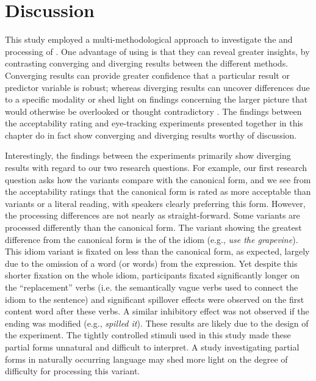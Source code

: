 \documentclass[output=paper
,modfonts
,nonflat]{langsci/langscibook}
\begin{document}

\section{Discussion} 

This study employed a multi-methodological  approach to investigate the  and processing  of . One advantage of using  is that they can reveal greater insights, by contrasting converging and diverging results between the different methods. Converging results can provide greater confidence that a particular result or predictor variable is robust; whereas diverging results can uncover differences due to a specific modality or shed light on findings concerning the larger picture that would otherwise be overlooked or thought contradictory \citep{ArppeJarvikivi2007}. The findings between the acceptability rating  and eye-tracking  experiments presented together in this chapter do in fact show converging and diverging results  worthy of discussion.

Interestingly, the findings between the experiments primarily show diverging results with regard to our two research questions. For example, our first research question asks how the variants compare with the canonical form, and we see from the acceptability ratings that the canonical form is rated as more acceptable than variants or a literal reading, with speakers clearly preferring this form. However, the processing differences are not nearly as straight-forward. Some variants are processed  differently than the canonical form. The variant showing the greatest difference from the canonical form is the  of the idiom (e.g., \textit{use the grapevine}). This idiom  variant  is fixated on less than the canonical form, as expected, largely due to the omission of a word (or words) from the expression. Yet despite this shorter fixation on the whole idiom, participants fixated significantly longer on the ``replacement'' verbs (i.e. the semantically vague verbs used to connect the idiom to the sentence) and significant spillover effects were observed on the first content word after these verbs. A similar inhibitory effect was not observed if the ending was modified (e.g., \textit{spilled it}). These results are likely due to the design of the experiment. The tightly controlled stimuli used in this study made these partial forms unnatural and difficult to interpret. A study investigating partial forms in naturally occurring language may shed more light on the degree of difficulty for processing this variant.
\end{document}
